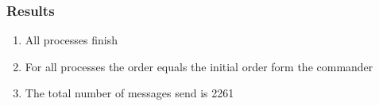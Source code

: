 \documentclass[a4paper, notitlepage]{article}
\begin{document}
\subsubsection*{Results}
\begin{enumerate}
\item All processes finish
\item For all processes the order equals the initial order form the commander
\item The total number of messages send is 2261
\end{enumerate}
\end{document}
